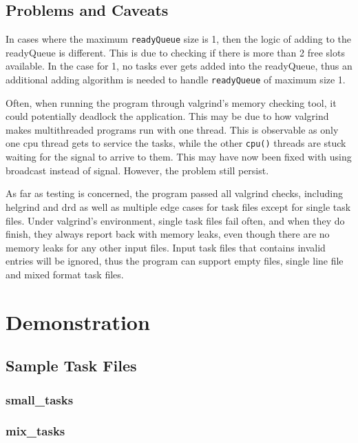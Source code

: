 \documentclass[a4paper, 12pt, titlepage]{article}
\newcommand{\code}[1]{\small\texttt{#1}\normalsize}
\begin{document}
\subsection{Problems and Caveats}
In cases where the maximum \code{readyQueue} size is 1, then the logic of
adding to the readyQueue is different. This is due to checking if there is more
than 2 free slots available. In the case for 1, no tasks ever gets added into
the readyQueue, thus an additional adding algorithm is needed to handle
\code{readyQueue} of maximum size 1.

Often, when running the program through valgrind's memory checking tool, it
could potentially deadlock the application. This may be due to how valgrind
makes multithreaded programs run with one thread. This is observable as only
one cpu thread gets to service the tasks, while the other \code{cpu()} threads
are stuck waiting for the signal to arrive to them. This may have now been
fixed with using broadcast instead of signal. However, the problem still
persist.

As far as testing is concerned, the program passed all valgrind checks,
including helgrind and drd as well as multiple edge cases for task files except
for single task files. Under valgrind's environment, single task files fail
often, and when they do finish, they always report back with memory leaks, even
though there are no memory leaks for any other input files. Input task files
that contains invalid entries will be ignored, thus the program can support
empty files, single line file and mixed format task files.

\newpage
\section{Demonstration}
\subsection{Sample Task Files}
\subsubsection{small\_tasks}


\subsubsection{mix\_tasks}

\end{document}
